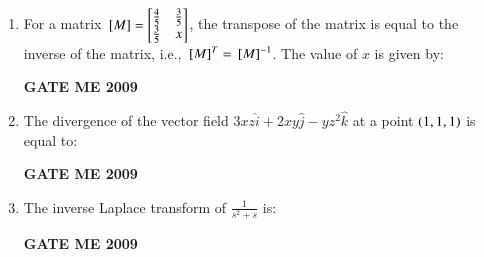 \documentclass[journal]{IEEEtran}
\begin{document}
\begin{enumerate}[leftmargin=0pt]
    


        

\item For a matrix ${}\left[M\right]=\begin{bmatrix} \frac{4}{5} & \frac{3}{5} \\ \frac{3}{5} & x \end{bmatrix}$, the transpose of the matrix is equal to the inverse of the matrix, i.e., ${}\left[M\right]^T={}\left[M\right]^{-1}$. The value of $x$ is given by:
  \begin{enumerate}
  \end{enumerate}
  \hfill{\textbf{GATE ME 2009}}


\item The divergence of the vector field $3 x z \hat{i} + 2 x y \hat{j} - y z^{2} \hat{k}$ at a point $\left(1,1,1\right)$ is equal to:
  \begin{enumerate}
        
  \end{enumerate}
  \hfill{\textbf{GATE ME 2009}}

\item The inverse Laplace transform of $\frac{1}{s^{2} + s}$ is:
  \begin{enumerate}
  \end{enumerate}
  \hfill{\textbf{GATE ME 2009}}


\end{enumerate}
\end{document}
